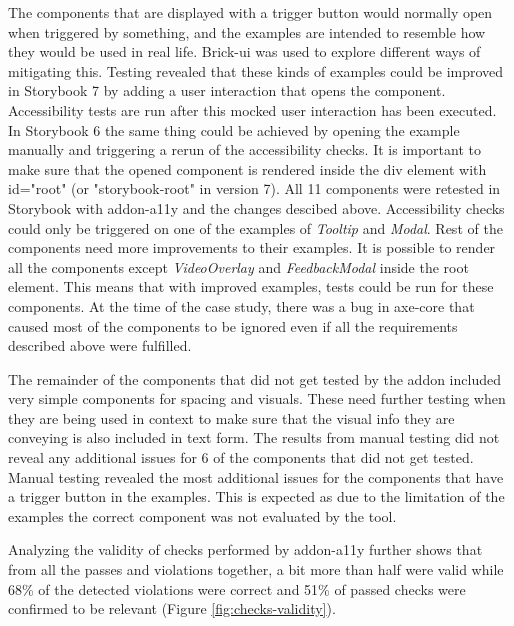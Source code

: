 \documentclass{master_thesis}
\begin{document}
The components that are displayed with a trigger button would normally open when triggered by something, and the examples are intended to resemble how they would be used in real life. Brick-ui was used to explore different ways of mitigating this. Testing revealed that these kinds of examples could be improved in Storybook 7 by adding a user interaction that opens the component. Accessibility tests are run after this mocked user interaction has been executed. In Storybook 6 the same thing could be achieved by opening the example manually and triggering a rerun of the accessibility checks. It is important to make sure that the opened component is rendered inside the div element with id="root" (or "storybook-root" in version 7). All 11 components were retested in Storybook with addon-a11y and the changes descibed above. Accessibility checks could only be triggered on one of the examples of \textit{Tooltip} and \textit{Modal}. Rest of the components need more improvements to their examples. It is possible to render all the components except \textit{VideoOverlay} and \textit{FeedbackModal} inside the root element. This means that with improved examples, tests could be run for these components. At the time of the case study, there was a bug in axe-core that caused most of the components to be ignored even if all the requirements described above were fulfilled.

The remainder of the components that did not get tested by the addon included very simple components for spacing and visuals. These need further testing when they are being used in context to make sure that the visual info they are conveying is also included in text form. The results from manual testing did not reveal any additional issues for 6 of the components that did not get tested. Manual testing revealed the most additional issues for the components that have a trigger button in the examples. This is expected as due to the limitation of the examples the correct component was not evaluated by the tool.

Analyzing the validity of checks performed by addon-a11y further shows that from all the passes and violations together, a bit more than half were valid while 68\% of the detected violations were correct and 51\% of passed checks were confirmed to be relevant (Figure \ref{fig:checks-validity}).
\end{document}
